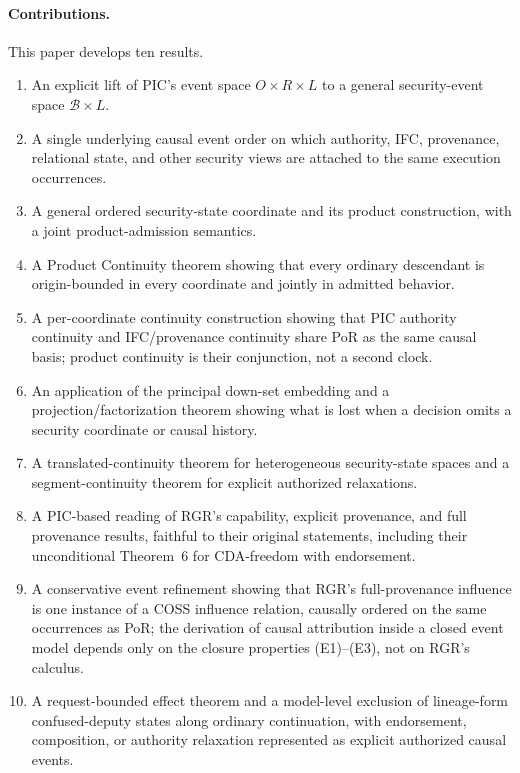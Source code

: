\documentclass[10pt,twocolumn]{article}
\newcommand{\Model}{\textnormal{\textsc{COSS}}\xspace}
\begin{document}
\paragraph{Contributions.}
This paper develops ten results.
\begin{enumerate}[leftmargin=*]
  \item An explicit lift of PIC's event space $O\times R\times L$ to a
        general security-event space $\mathcal{B}\times L$.
  \item A single underlying causal event order on which authority, IFC,
        provenance, relational state, and other security views are attached to
        the same execution occurrences.
  \item A general ordered security-state coordinate and its product
        construction, with a joint product-admission semantics.
  \item A Product Continuity theorem showing that every ordinary descendant
        is origin-bounded in every coordinate and jointly in admitted behavior.
  \item A per-coordinate continuity construction showing that PIC authority
        continuity and IFC/provenance continuity share PoR as the same causal
        basis; product continuity is their conjunction, not a second clock.
  \item An application of the principal down-set embedding and a
        projection/factorization theorem showing what is lost when a decision
        omits a security coordinate or causal history.
  \item A translated-continuity theorem for heterogeneous security-state
        spaces and a segment-continuity theorem for explicit authorized
        relaxations.
  \item A PIC-based reading of RGR's capability, explicit provenance, and
        full provenance results, faithful to their original statements,
        including their unconditional Theorem~6 for CDA-freedom with
        endorsement.
  \item A conservative event refinement showing that RGR's full-provenance
        influence is one instance of a \Model influence relation, causally
        ordered on the same occurrences as PoR; the derivation of causal
        attribution inside a closed event model depends only on the closure
        properties (E1)--(E3), not on RGR's calculus.
  \item A request-bounded effect theorem and a model-level exclusion of
        lineage-form confused-deputy states along ordinary continuation, with
        endorsement, composition, or authority relaxation represented as
        explicit authorized causal events.
\end{enumerate}
\end{document}
